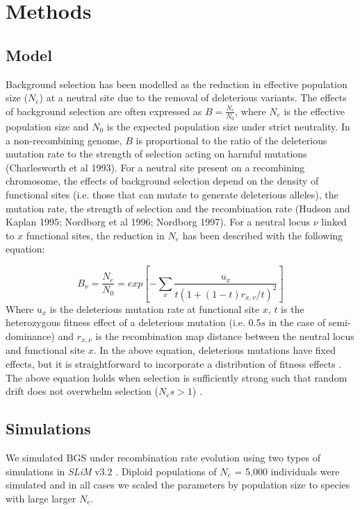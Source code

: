 \documentclass[11pt,twoside, onecolumn]{GSA_format}
\begin{document}
\section{Methods}
\subsection{Model}
Background selection has been modelled as the reduction in effective population size ($N_e$) at a neutral site due to the removal of deleterious variants. The effects of background selection are often expressed as $B = \frac{N_e}{N_0}$, where $N_e$ is the effective population size and $N_0$ is the expected population size under strict neutrality. In a non-recombining genome, $B$ is proportional to the ratio of the deleterious mutation rate to the strength of selection acting on harmful mutations (Charlesworth et al 1993). For a neutral site present on a recombining chromosome, the effects of background selection depend on the density of functional sites (i.e. those that can mutate to generate deleterious alleles), the mutation rate, the strength of selection and the recombination rate (Hudson and Kaplan 1995; Nordborg et al 1996; Nordborg 1997). For a neutral locus $\nu$ linked to $x$ functional sites, the reduction in $N_e$ has been described with the following equation:

\begin{equation}
B_{\nu} = \frac{N_e}{N_0} = exp[ -\sum\limits_x \frac{u_x}{t(1+(1-t)r_{x,v}/t)^2} ]
\label{nordborg}
\end{equation}\noindent
Where $u_x$ is the deleterious mutation rate at functional site $x$, $t$ is the heterozygous fitness effect of a deleterious mutation (i.e. 0.5$s$ in the case of semi-dominance) and $r_{x,\nu}$ is the recombination map distance between the neutral locus and functional site $x$. In the above equation, deleterious mutations have fixed effects, but it is straightforward to incorporate a distribution of fitness effects \citep{RN157}. The above equation holds when selection is sufficiently strong  such that random drift does not overwhelm selection ($N_es > 1$) \citep{Good2014}. \\
 


\subsection{Simulations}

We simulated BGS under recombination rate evolution using two types of simulations in \textit{SLiM} v3.2 \citep{Haller2019-jv}. Diploid populations of $N_e$ = 5,000 individuals were simulated and in all  cases we scaled the parameters by population size to species with large larger $N_e$. \\
\end{document}

